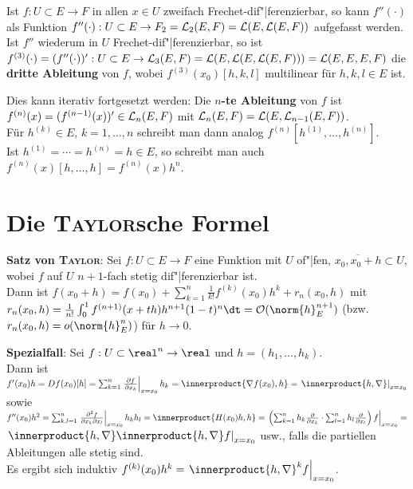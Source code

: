 \vspace{10pt}
\linie

Ist $f: U \subset E \rightarrow F$ in allen $x \in U$ zweifach
Frechet-dif"|ferenzierbar, so kann $f''(\cdot)$
als Funktion $f''(\cdot): U \subset E \rightarrow
F_2 = \mathcal{L}_2(E, F) = \mathcal{L}(E, \mathcal{L}(E, F))$ aufgefasst werden. \\
Ist $f''$ wiederum in $U$ Frechet-dif"|ferenzierbar, so ist \\
$f^{(3)}(\cdot) = (f''(\cdot))': U \subset E \rightarrow \mathcal{L}_3(E, F)
= \mathcal{L}(E, \mathcal{L}(E, \mathcal{L}(E, F))) = \mathcal{L}(E, E, E, F)$ die
\textbf{dritte Ableitung} von $f$, wobei
$f^{(3)}(x_0)[h, k, l]$ multilinear für $h, k, l \in E$ ist.

Dies kann iterativ fortgesetzt werden: Die \textbf{$n$-te Ableitung}
von $f$ ist \\
$f^{(n)}(x) = (f^{(n-1)}(x))' \in \mathcal{L}_n(E, F)$
mit $\mathcal{L}_n(E, F) = \mathcal{L}(E, \mathcal{L}_{n-1}(E, F))$. \\
Für $h^{(k)} \in E$, $k = 1, \dotsc, n$ schreibt man dann analog
$f^{(n)}[h^{(1)}, \dotsc, h^{(n)}]$. \\
Ist $h^{(1)} = \dotsb = h^{(n)} = h \in E$, so schreibt man
auch $f^{(n)}(x)[h, \dotsc, h] = f^{(n)}(x)h^n$.

\pagebreak

\section{%
    Die \textsc{Taylor}sche Formel%
}

\textbf{Satz von \textsc{Taylor}}:
Sei $f: U \subset E \rightarrow F$ eine Funktion mit $U$ of"|fen,
$\overline{x_0, x_0 + h} \subset U$, wobei $f$ auf $U$ $n + 1$-fach
stetig dif"|ferenzierbar ist. \\
Dann ist $f(x_0 + h) = f(x_0) + \sum_{k=1}^n \frac{1}{k!} f^{(k)}(x_0) h^k +
r_n(x_0, h)$ mit \\
$r_n(x_0, h) =
\frac{1}{n!} \int_0^1 f^{(n+1)}(x + th)h^{n+1} (1 - t)^n \dt =
\mathcal{O}(\norm{h}_E^{n+1})$ (bzw. $r_n(x_0, h) = o(\norm{h}_E^n)$) für
$h \to 0$.

\linie

\textbf{Spezialfall}:
Sei $f: U \subset \real^n \rightarrow \real$ und $h = (h_1, \dotsc, h_k)$. \\
Dann ist $f'(x_0)h = Df(x_0)[h] =
\sum_{k=1}^n \left.\frac{\partial f}{\partial x_k}\right|_{x=x_0}h_k =
\innerproduct{\nabla f(x_0), h} = \left.\innerproduct{h, \nabla}\right|_{x=x_0}$ sowie \\
$f''(x_0)h^2 = \sum_{k,l=1}^n \left.
\frac{\partial^2 f}{\partial x_k \partial x_l}\right|_{x=x_0} h_k h_l =
\innerproduct{H(x_0)h, h} =
\left.\left(\sum_{k=1}^n h_k \frac{\partial}{\partial x_k} \cdot
\sum_{l=1}^n h_l \frac{\partial}{\partial x_l}\right) f\right|_{x=x_0} =$ \\
$\left.\innerproduct{h, \nabla}\innerproduct{h, \nabla}f\right|_{x=x_0}$ usw., falls
die partiellen Ableitungen alle stetig sind. \\
Es ergibt sich induktiv
$f^{(k)}(x_0)h^k = \left.\innerproduct{h, \nabla}^k f\right|_{x=x_0}$.

